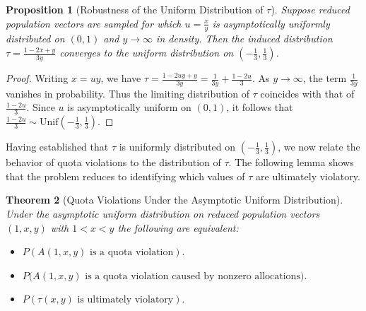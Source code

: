 \documentclass[11pt]{article}
\newtheorem{theorem}{Theorem}[section]
\newtheorem{prop}[theorem]{Proposition}
\theoremstyle{definition}
\theoremstyle{definition}
\begin{document}
\begin{prop}[Robustness of the Uniform Distribution of $\tau$]
\label{tau_ratio_uniform}
Suppose reduced population vectors are sampled for which $u=\frac{x}{y}$ is asymptotically uniformly distributed on $(0,1)$ and $y \to \infty$ in density.
Then the induced distribution $\tau = \frac{1-2x+y}{3y}$ converges to the uniform distribution on $\left(-\frac13,\frac13\right)$.
\end{prop}

\begin{proof}
Writing $x=uy$, we have $\tau = \frac{1-2uy+y}{3y}= \frac{1}{3y} + \frac{1-2u}{3}.$
As $y \to \infty$, the term $\frac{1}{3y}$ vanishes in probability. 
Thus the limiting distribution of $\tau$ coincides with that of 
$\frac{1-2u}{3}.$
Since $u$ is asymptotically uniform on $(0,1)$, it follows that $\frac{1-2u}{3}\sim \mathrm{Unif}\!\left(-\frac13,\frac13\right)$.
\end{proof}

Having established that $\tau$ is uniformly distributed on $\left(-\tfrac13,\tfrac13\right)$, we now relate the behavior of quota violations to the distribution of $\tau$. The following lemma shows that the problem reduces to identifying which values of $\tau$ are ultimately violatory.

\begin{theorem}[Quota Violations Under the Asymptotic Uniform Distribution]
\label{zero_one_quota}
Under the asymptotic uniform distribution on reduced population vectors $(1,x,y)$ with $1<x<y$ the following are equivalent:
\begin{itemize} 
\item $P(A(1,x,y) \text{ is a quota violation}). $
\item $P(A(1,x,y) \text{ is a quota violation caused by nonzero allocations)}.$ 
\item $P(\tau(x,y) \text{ is ultimately violatory}).$
\end{itemize}
\end{theorem}
\end{document}
